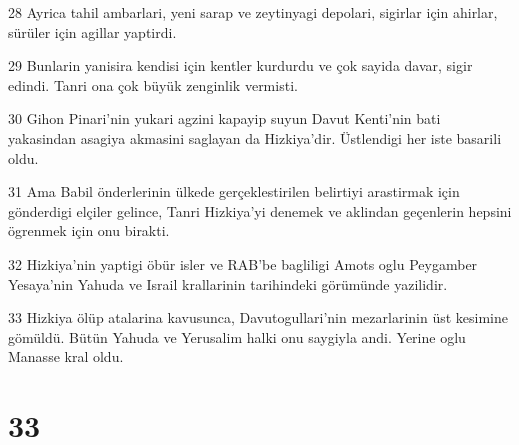 \par 28 Ayrica tahil ambarlari, yeni sarap ve zeytinyagi depolari, sigirlar için ahirlar, sürüler için agillar yaptirdi.
\par 29 Bunlarin yanisira kendisi için kentler kurdurdu ve çok sayida davar, sigir edindi. Tanri ona çok büyük zenginlik vermisti.
\par 30 Gihon Pinari'nin yukari agzini kapayip suyun Davut Kenti'nin bati yakasindan asagiya akmasini saglayan da Hizkiya'dir. Üstlendigi her iste basarili oldu.
\par 31 Ama Babil önderlerinin ülkede gerçeklestirilen belirtiyi arastirmak için gönderdigi elçiler gelince, Tanri Hizkiya'yi denemek ve aklindan geçenlerin hepsini ögrenmek için onu birakti.
\par 32 Hizkiya'nin yaptigi öbür isler ve RAB'be bagliligi Amots oglu Peygamber Yesaya'nin Yahuda ve Israil krallarinin tarihindeki görümünde yazilidir.
\par 33 Hizkiya ölüp atalarina kavusunca, Davutogullari'nin mezarlarinin üst kesimine gömüldü. Bütün Yahuda ve Yerusalim halki onu saygiyla andi. Yerine oglu Manasse kral oldu.

\chapter{33}

